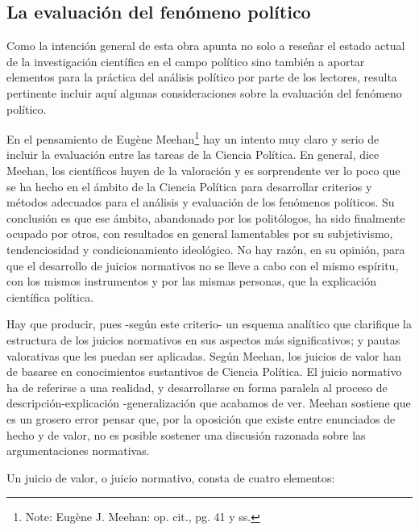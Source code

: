 \documentclass[
]{book}
\begin{document}
\hypertarget{la-evaluaciuxf3n-del-fenuxf3meno-poluxedtico}{%
\subsection*{La evaluación del fenómeno político}\label{la-evaluaciuxf3n-del-fenuxf3meno-poluxedtico}}

Como la intención general de esta obra apunta no solo a reseñar el estado actual de la investigación científica en el campo político sino también a aportar elementos para la práctica del análisis político por parte de los lectores, resulta pertinente incluir aquí algunas consideraciones sobre la evaluación del fenómeno político.

En el pensamiento de Eugène Meehan\footnote{Note: Eugène J. Meehan: op. cit., pg. 41 y ss.} hay un intento muy claro y serio de incluir la evaluación entre las tareas de la Ciencia Política. En general, dice Meehan, los científicos huyen de la valoración y es sorprendente ver lo poco que se ha hecho en el ámbito de la Ciencia Política para desarrollar criterios y métodos adecuados para el análisis y evaluación de los fenómenos políticos. Su conclusión es que ese ámbito, abandonado por los politólogos, ha sido finalmente ocupado por otros, con resultados en general lamentables por su subjetivismo, tendenciosidad y condicionamiento ideológico. No hay razón, en su opinión, para que el desarrollo de juicios normativos no se lleve a cabo con el mismo espíritu, con los mismos instrumentos y por las mismas personas, que la explicación científica política.

Hay que producir, pues -según este criterio- un esquema analítico que clarifique la estructura de los juicios normativos en sus aspectos más significativos; y pautas valorativas que les puedan ser aplicadas. Según Meehan, los juicios de valor han de basarse en conocimientos sustantivos de Ciencia Política. El juicio normativo ha de referirse a una realidad, y desarrollarse en forma paralela al proceso de descripción-explicación -generalización que acabamos de ver. Meehan sostiene que es un grosero error pensar que, por la oposición que existe entre enunciados de hecho y de valor, no es posible sostener una discusión razonada sobre las argumentaciones normativas.

Un juicio de valor, o juicio normativo, consta de cuatro elementos:
\end{document}
